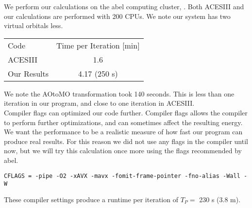 We perform our calculations on the abel computing cluster, \cite{abel_po_g_citation1234567}. Both ACESIII and our calculations are performed with 200 CPUs. We note our system has two virtual orbitals less. \\

\begin{center}
\begin{tabular}{ l c}
	\hline
  	Code & Time per Iteration [min] \\
  	ACESIII & 1.6 \\
  	Our Results & 4.17 (250 s) \\ \hline
	\end{tabular}
\end{center}

We note the AOtoMO transformation took 140 seconds. This is less than one iteration in our program, and close to one iteration in ACESIII. \\

Compiler flags can optimized our code further. Compiler flags allows the compiler to perform further optimizations, and can sometimes affect the resulting energy. We want the performance to be a realistic measure of how fast our program can produce real results. For this reason we did not use any flags in the compiler until now, but we will try this calculation once more using the flags recommended by abel. 

\begin{lstlisting}
CFLAGS = -pipe -O2 -xAVX -mavx -fomit-frame-pointer -fno-alias -Wall -W
\end{lstlisting}
These compiler settings produce a runtime per iteration of $T_P = $ 230 s (3.8 m).

